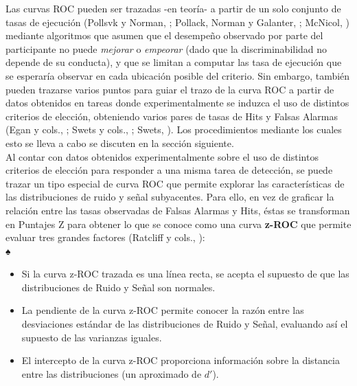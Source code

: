 Las curvas ROC pueden ser trazadas -en teoría- a partir de un solo conjunto de tasas de ejecución (Pollsvk y Norman, \citeyear{Pollack1964a}; Pollack, Norman y Galanter, \citeyear{Pollack1964b}; McNicol, \citeyear{McNicol2}) mediante algoritmos que asumen que el desempeño observado por parte del participante no puede \textit{mejorar} o \textit{empeorar} (dado que la discriminabilidad no depende de su conducta), y que se limitan a computar las tasa de ejecución que se esperaría observar en cada ubicación posible del criterio. Sin embargo, también pueden trazarse varios puntos para guiar el trazo de la curva ROC a partir de datos obtenidos en tareas donde experimentalmente se induzca el uso de distintos criterios de elección, obteniendo varios pares de tasas de Hits y Falsas Alarmas (Egan y cols., \citeyear{Egan1959}; Swets y cols., \citeyear{Swets1961}; Swets, \citeyear{Swets1986}). Los procedimientos mediante los cuales esto se lleva a cabo se discuten en la sección siguiente.\\

Al contar con datos obtenidos experimentalmente sobre el uso de distintos criterios de elección para responder a una misma tarea de detección, se puede trazar un tipo especial de curva ROC que permite explorar las características de las distribuciones de ruido y señal subyacentes. Para ello, en vez de graficar la relación entre las tasas observadas de Falsas Alarmas y Hits, éstas se transforman en Puntajes Z para obtener lo que se conoce como una curva \textbf{z-ROC} que permite evaluar tres grandes factores (Ratcliff y cols., \citeyear{Ratcliff1992}):\\♠

\begin{itemize}
\item Si la curva z-ROC trazada es una línea recta, se acepta el supuesto de que las distribuciones de Ruido y Señal son normales.\\
\item La pendiente de la curva z-ROC permite conocer la razón entre las desviaciones estándar de las distribuciones de Ruido y Señal, evaluando así el supuesto de las varianzas iguales.\\
\item El intercepto de la curva z-ROC proporciona información sobre la distancia entre las distribuciones (un aproximado de $d'$).\\
\end{itemize}




